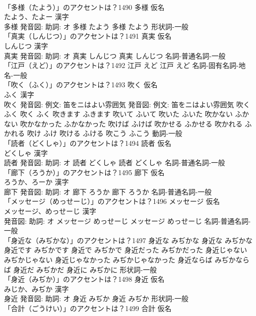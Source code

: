 \documentclass[8pt]{extreport}
\begin{document}
\begin{CJK}{UTF8}{min}
\\	「多様（たよう）」のアクセントは？1490	多様 仮名　
\\	たよう、たよー 漢字　
\\	多様 発音図: 助詞: オ	多様 たよう		多様 たよう				形状詞-一般 
\\	「真実（しんじつ）」のアクセントは？1491	真実 仮名　
\\	しんじつ 漢字　
\\	真実 発音図: 助詞: オ	真実 しんじつ		真実 しんじつ				名詞-普通名詞-一般 
\\	「江戸（えど）」のアクセントは？1492		江戸 えど		江戸 えど				名詞-固有名詞-地名-一般 
\\	「吹く（ふく）」のアクセントは？1493	吹く 仮名　
\\	ふく 漢字　
\\	吹く 発音図: 例文: 笛をニはよい雰囲気 発音図: 例文: 笛をニはよい雰囲気	吹く ふく		吹く ふく 吹きます ふきます 吹いて ふいて 吹いた ふいた 吹かない ふかない 吹かなかった ふかなかった 吹けば ふけば 吹かせる ふかせる 吹かれる ふかれる 吹け ふけ 吹ける ふける 吹こう ふこう				動詞-一般 
\\	「読者（どくしゃ）」のアクセントは？1494	読者 仮名　
\\	どくしゃ 漢字　
\\	読者 発音図: 助詞: オ	読者 どくしゃ		読者 どくしゃ				名詞-普通名詞-一般 
\\	「廊下（ろうか）」のアクセントは？1495	廊下 仮名　
\\	ろうか、ろーか 漢字　
\\	廊下 発音図: 助詞: オ	廊下 ろうか		廊下 ろうか				名詞-普通名詞-一般 
\\	「メッセージ（めっせーじ）」のアクセントは？1496	メッセージ 仮名　
\\	メッセージ、めっせーじ 漢字　
\\	発音図: 助詞: オ	メッセージ めっせーじ		メッセージ めっせーじ				名詞-普通名詞-一般 
\\	「身近な（みぢかな）」のアクセントは？1497		身近な みぢかな		身近な みぢかな 身近です みぢかです 身近で みぢかで 身近だった みぢかだった 身近じゃない みぢかじゃない 身近じゃなかった みぢかじゃなかった 身近ならば みぢかならば 身近だ みぢかだ 身近に みぢかに				形状詞-一般 
\\	「身近（みぢか）」のアクセントは？1498	身近 仮名　
\\	みじか、みぢか 漢字　
\\	身近 発音図: 助詞: オ	身近 みぢか		身近 みぢか				形状詞-一般 
\\	「合計（ごうけい）」のアクセントは？1499	合計 仮名　

\end{CJK}
\end{document}
